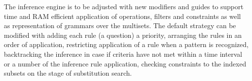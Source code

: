 \documentclass[conference]{IEEEtran}
\begin{document}
The inference engine is to be adjusted with new modifiers and guides to support time and RAM efficient application of operations, filters and constraints as well as representation of grammars over the multisets. The default strategy can be modified with adding each rule (a question) a priority, arranging the rules in an order of application, restricting application of a rule when a pattern is recognized, backtracking the inference in case if criteria have not met within a time interval or a number of the inference rule application, checking constraints to the indexed subsets on the stage of substitution search.




\end{document}
